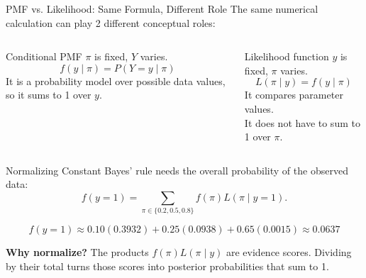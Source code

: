 \documentclass[12pt]{beamer}
\begin{document}
\begin{frame}{}
\small
\begin{block}{PMF vs. Likelihood: Same Formula, Different Role}
\vspace{0.4cm}
The same numerical calculation can play 2 different conceptual roles:

\begin{columns}[T,onlytextwidth]
\begin{block}{Conditional PMF}
$\pi$ is fixed, $Y$ varies.
\[
f(y\mid\pi)=P(Y=y\mid\pi)
\]
It is a probability model over possible data values, so it sums to 1 over $y$.
\end{block}

\begin{block}{Likelihood function}
$y$ is fixed, $\pi$ varies.
\[
L(\pi\mid y)=f(y\mid\pi)
\]
It compares parameter values.\\It does \alert{not} have to sum to 1 over $\pi$.
\end{block}
\end{columns}
\end{block}
\end{frame}

\begin{frame}{}
\begin{block}{Normalizing Constant}
Bayes' rule needs the overall probability of the observed data:
\[
f(y=1)=\sum_{\pi \in \{0.2,0.5,0.8\}} f(\pi)L(\pi\mid y=1).
\]

\[
f(y=1) \approx 0.10(0.3932)+0.25(0.0938)+0.65(0.0015) \approx 0.0637
\]

\textbf{Why normalize?}
The products $f(\pi)L(\pi\mid y)$ are evidence scores. Dividing by their total turns those scores into posterior probabilities that sum to 1.
\end{block}
\end{frame}
\end{document}
